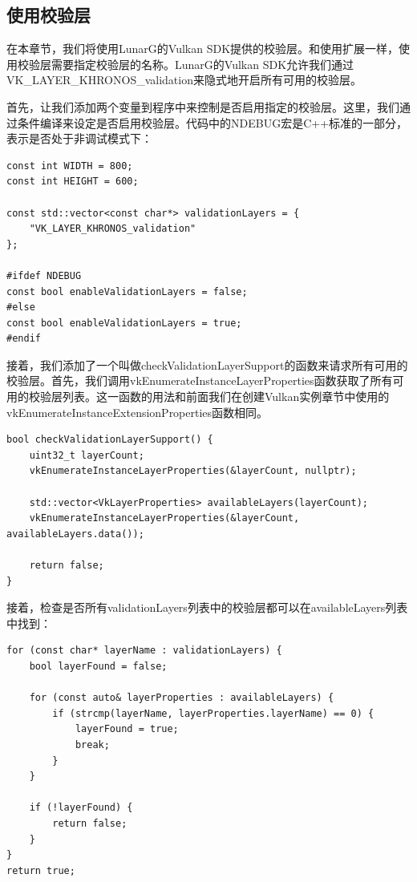 \documentclass{ctexart}
\begin{document}
\subsection{使用校验层}

在本章节，我们将使用LunarG的Vulkan SDK提供的校验层。和使用扩展一样，使用校验层需要指定校验层的名称。LunarG的Vulkan SDK允许我们通过VK\_LAYER\_KHRONOS\_validation来隐式地开启所有可用的校验层。

首先，让我们添加两个变量到程序中来控制是否启用指定的校验层。这里，我们通过条件编译来设定是否启用校验层。代码中的NDEBUG宏是C++标准的一部分，表示是否处于非调试模式下：

\begin{lstlisting}[language={[ANSI]C}]
const int WIDTH = 800;
const int HEIGHT = 600;

const std::vector<const char*> validationLayers = {
	"VK_LAYER_KHRONOS_validation"
};

#ifdef NDEBUG
const bool enableValidationLayers = false;
#else
const bool enableValidationLayers = true;
#endif
\end{lstlisting}

接着，我们添加了一个叫做checkValidationLayerSupport的函数来请求所有可用的校验层。首先，我们调用vkEnumerateInstanceLayerProperties函数获取了所有可用的校验层列表。这一函数的用法和前面我们在创建Vulkan实例章节中使用的vkEnumerateInstanceExtensionProperties函数相同。

\begin{lstlisting}[language={[ANSI]C}]
bool checkValidationLayerSupport() {
	uint32_t layerCount;
	vkEnumerateInstanceLayerProperties(&layerCount, nullptr);

	std::vector<VkLayerProperties> availableLayers(layerCount);
	vkEnumerateInstanceLayerProperties(&layerCount, availableLayers.data());

	return false;
}
\end{lstlisting}

接着，检查是否所有validationLayers列表中的校验层都可以在availableLayers列表中找到：

\begin{lstlisting}[language={[ANSI]C}]
for (const char* layerName : validationLayers) {
	bool layerFound = false;

	for (const auto& layerProperties : availableLayers) {
		if (strcmp(layerName, layerProperties.layerName) == 0) {
			layerFound = true;
			break;
		}
	}

	if (!layerFound) {
		return false;
	}
}
return true;
\end{lstlisting}
\end{document}
